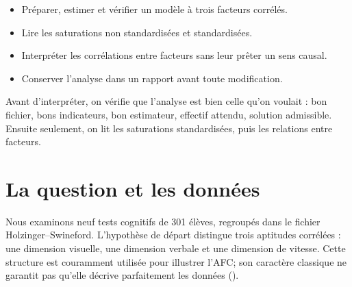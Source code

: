 \documentclass[
  french,
  11pt,
  a4paper,
  DIV=11,
  numbers=noendperiod]{scrreprt}
\providecommand{\tightlist}{%
  \setlength{\itemsep}{0pt}\setlength{\parskip}{0pt}}
\begin{document}
\begin{tcolorbox}[enhanced jigsaw, arc=.35mm, bottomrule=.15mm, bottomtitle=1mm, breakable, colback=white, colbacktitle=quarto-callout-note-color!10!white, colframe=quarto-callout-note-color-frame, coltitle=black, left=2mm, leftrule=.75mm, opacityback=0, opacitybacktitle=0.6, rightrule=.15mm, title={Objectifs du chapitre}, titlerule=0mm, toprule=.15mm, toptitle=1mm]

\begin{itemize}
\tightlist
\item
  Préparer, estimer et vérifier un modèle à trois facteurs corrélés.
\item
  Lire les saturations non standardisées et standardisées.
\item
  Interpréter les corrélations entre facteurs sans leur prêter un sens
  causal.
\item
  Conserver l'analyse dans un rapport avant toute modification.
\end{itemize}

\end{tcolorbox}

\begin{tcolorbox}[enhanced jigsaw, arc=.35mm, bottomrule=.15mm, bottomtitle=1mm, breakable, colback=white, colbacktitle=quarto-callout-tip-color!10!white, colframe=quarto-callout-tip-color-frame, coltitle=black, left=2mm, leftrule=.75mm, opacityback=0, opacitybacktitle=0.6, rightrule=.15mm, title={Idée centrale}, titlerule=0mm, toprule=.15mm, toptitle=1mm]

Avant d'interpréter, on vérifie que l'analyse est bien celle qu'on
voulait : bon fichier, bons indicateurs, bon estimateur, effectif
attendu, solution admissible. Ensuite seulement, on lit les saturations
standardisées, puis les relations entre facteurs.

\end{tcolorbox}

\section{La question et les
données}\label{la-question-et-les-donnuxe9es}

Nous examinons neuf tests cognitifs de 301 élèves, regroupés dans le
fichier Holzinger--Swineford. L'hypothèse de départ distingue trois
aptitudes corrélées : une dimension visuelle, une dimension verbale et
une dimension de vitesse. Cette structure est couramment utilisée pour
illustrer l'AFC; son caractère classique ne garantit pas qu'elle décrive
parfaitement les données ().
\end{document}
